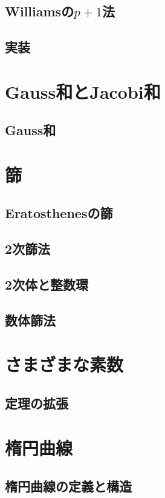 \subsection{Williamsの$p+1$法}

\subsection{実装}


\section{Gauss和とJacobi和}
\subsection{Gauss和}


\section{篩}
\subsection{Eratosthenesの篩}

\subsection{2次篩法}

\subsection{2次体と整数環}

\subsection{数体篩法}


\section{さまざまな素数}
\subsection{定理の拡張}


\section{楕円曲線}
\subsection{楕円曲線の定義と構造}

